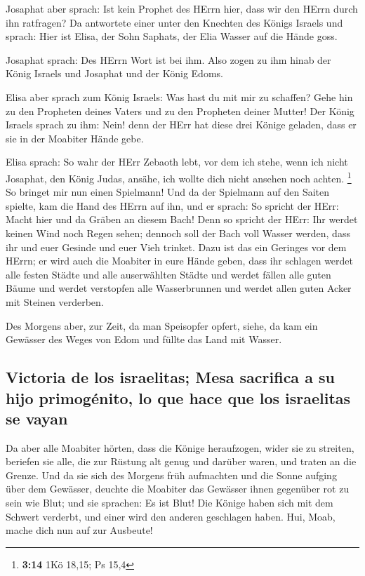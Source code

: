  Josaphat aber sprach: Ist kein Prophet des HErrn hier,
dass wir den HErrn durch ihn ratfragen? Da antwortete einer unter den
Knechten des Königs Israels und sprach: Hier ist Elisa, der Sohn
Saphats, der Elia Wasser auf die Hände goss.

 Josaphat sprach: Des HErrn Wort ist bei ihm. Also zogen
zu ihm hinab der König Israels und Josaphat und der König Edoms.

 Elisa aber sprach zum König Israels: Was hast du mit mir
zu schaffen? Gehe hin zu den Propheten deines Vaters und zu den
Propheten deiner Mutter! Der König Israels sprach zu ihm: Nein! denn der
HErr hat diese drei Könige geladen, dass er sie in der Moabiter Hände
gebe.

 Elisa sprach: So wahr der HErr Zebaoth lebt, vor dem ich
stehe, wenn ich nicht Josaphat, den König Judas, ansähe, ich wollte dich
nicht ansehen noch achten. \footnote{\textbf{3:14} 1Kö 18,15; Ps 15,4}
 So bringet mir nun einen Spielmann! Und da der Spielmann
auf den Saiten spielte, kam die Hand des HErrn auf ihn, 
und er sprach: So spricht der HErr: Macht hier und da Gräben an diesem
Bach!  Denn so spricht der HErr: Ihr werdet keinen Wind
noch Regen sehen; dennoch soll der Bach voll Wasser werden, dass ihr und
euer Gesinde und euer Vieh trinket.  Dazu ist das ein
Geringes vor dem HErrn; er wird auch die Moabiter in eure Hände geben,
 dass ihr schlagen werdet alle festen Städte und alle
auserwählten Städte und werdet fällen alle guten Bäume und werdet
verstopfen alle Wasserbrunnen und werdet allen guten Acker mit Steinen
verderben.

 Des Morgens aber, zur Zeit, da man Speisopfer opfert,
siehe, da kam ein Gewässer des Weges von Edom und füllte das Land mit
Wasser.

\hypertarget{victoria-de-los-israelitas-mesa-sacrifica-a-su-hijo-primoguxe9nito-lo-que-hace-que-los-israelitas-se-vayan}{%
\subsection{Victoria de los israelitas; Mesa sacrifica a su hijo
primogénito, lo que hace que los israelitas se
vayan}\label{victoria-de-los-israelitas-mesa-sacrifica-a-su-hijo-primoguxe9nito-lo-que-hace-que-los-israelitas-se-vayan}}

 Da aber alle Moabiter hörten, dass die Könige
heraufzogen, wider sie zu streiten, beriefen sie alle, die zur Rüstung
alt genug und darüber waren, und traten an die Grenze. 
Und da sie sich des Morgens früh aufmachten und die Sonne aufging über
dem Gewässer, deuchte die Moabiter das Gewässer ihnen gegenüber rot zu
sein wie Blut;  und sie sprachen: Es ist Blut! Die Könige
haben sich mit dem Schwert verderbt, und einer wird den anderen
geschlagen haben. Hui, Moab, mache dich nun auf zur Ausbeute!


